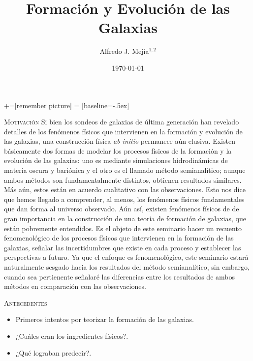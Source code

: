 \documentclass[xcolor=dvipsnames,4pt,hyperref={colorlinks,citecolor=black,linkcolor=black,urlcolor=black}]{beamer}
\begin{document}
+=[remember picture]
 = [baseline=-.5ex]

\begin{frame}
\title{Formación y Evolución de las Galaxias}
\author{Alfredo J. Mej\'ia$^{1,2}$}

\date{\today}


\maketitle
\end{frame}

\begin{frame}[allowframebreaks]{\textsc{Motivación}}
%
Si bien los sondeos de galaxias de última generación han revelado detalles de los fenómenos físicos
que intervienen en la formación y evolución de las galaxias, una construcción física \emph{ab
initio} permanece aún elusiva. Existen básicamente dos formas de modelar los procesos físicos de la
formación y la evolución de las galaxias: uno es mediante simulaciones hidrodinámicas de materia
oscura y bariónica y el otro es el llamado método semianalítico; aunque ambos métodos son
fundamentalmente distintos, obtienen resultados similares. Más aún, estos están en acuerdo
cualitativo con las observaciones. Esto nos dice que hemos llegado a comprender, al menos, los
fenómenos físicos fundamentales que dan forma al universo observado. Aún así, existen fenómenos
físicos de de gran importancia en la construcción de una teoría de formación de galaxias, que están
pobremente entendidos. Es el objeto de este seminario hacer un recuento fenomenológico de los
procesos físicos que intervienen en la formación de las galaxias, señalar las incertidumbres que
existe en cada proceso y establecer las perspectivas a futuro. Ya que el enfoque es fenomenológico,
este seminario estará naturalmente sesgado hacia los resultados del método semianalítico, sin
embargo, cuando sea pertienente señalaré las diferencias entre los resultados de ambos métodos en
comparación con las observaciones.
%
\end{frame}

\begin{frame}[allowframebreaks]{\textsc{Antecedentes}}
%
\begin{itemize}
\item Primeros intentos por teorizar la formación de las galaxias.
\item ¿Cuáles eran los ingredientes físicos?.
\item ¿Qué lograban predecir?.
\end{itemize}
%
\end{frame}
\end{document}
